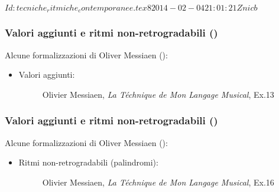 %
%
\svnInfo $Id: tecniche_ritmiche_contemporanee.tex 8 2014-02-04 21:01:21Z nicb $

\setcounter{om}{0}
\setcounter{ms}{0}
\begin{frame}
    \frametitle{Valori aggiunti e ritmi non-retrogradabili ()}

    Alcune formalizzazioni di Oliver Messiaen ():

    \begin{itemize}

        \item Valori aggiunti:

            \begin{center}
                \begin{figure}
                    \caption{Olivier Messiaen, \emph{La T\'echnique de Mon Langage Musical}, Ex.13}
                \end{figure}
            \end{center}

    \end{itemize}

\end{frame}

\begin{frame}
    \frametitle{Valori aggiunti e ritmi non-retrogradabili ()}

    Alcune formalizzazioni di Oliver Messiaen ():

    \begin{itemize}
        \item Ritmi non-retrogradabili (palindromi):

            \begin{center}
                \begin{figure}
                    \caption{Olivier Messiaen, \emph{La T\'echnique de Mon Langage Musical}, Ex.16}
                \end{figure}
            \end{center}

    \end{itemize}

\end{frame}

